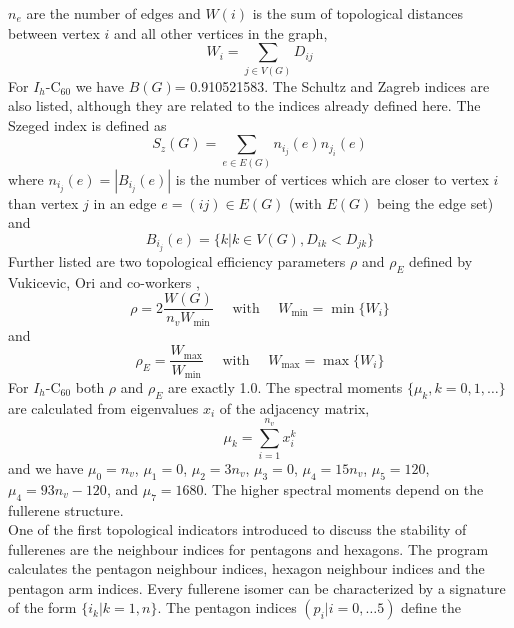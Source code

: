 \documentclass[article,a4paper,twoside]{memoir}
\newcommand{\C}[1]{\ensuremath{\mathrm{C}_{#1}}}
\begin{document}
$n_e$ are the number of edges and $W(i)$ is the sum of topological distances between vertex $i$ and all other vertices in the graph,
\begin{equation}
  \label{sum}
  W_i=\sum_{j \in V(G)} D_{ij}
\end{equation}
For $I_h$-\C{60} we have $B(G)$= 0.910521583. The Schultz and Zagreb indices are also listed, although they are related to
the indices already defined here. The Szeged index is defined as\cite{Heydari}
\begin{equation}
  \label{Szeged}
  S_z(G)=\sum_{e \in E(G)} n_{i_j}(e)n_{j_i}(e)
\end{equation}
where $n_{i_j}(e) = |B_{i_j}(e)|$ is the number of vertices which are closer to vertex $i$ than vertex $j$ in an edge $e=(ij) \in E(G)$ (with
$E(G)$ being the edge set) and
\begin{equation}
  \label{Szeged1}
  B_{i_j}(e)= \{ k | k \in V(G), D_{ik} < D_{jk} \}
\end{equation}
Further listed are two topological efficiency parameters $\rho$ and $\rho_E$ defined by Vukicevic, Ori and co-workers \cite{Vukicevic,Ori},
\begin{equation}
  \label{rho}
  \rho=2\frac{W(G)}{n_v W_{\mathrm{min}}} \quad \text{ with } \quad W_{\mathrm{min}}= \min \{ W_i \}
\end{equation}
and
\begin{equation}
  \label{rhoE}
  \rho_E=\frac{W_{\mathrm{max}}}{W_{\mathrm{min}}} \quad \text{ with } \quad W_{\mathrm{max}}= \max \{ W_i \}
\end{equation}
For $I_h$-\C{60} both $\rho$ and $\rho_E$ are exactly 1.0. The spectral moments $\{ \mu_k, k=0,1,\dots \} $ are calculated from eigenvalues $x_i$ of the adjacency matrix,
\begin{equation}
  \label{specmom}
  \mu_k=\sum_{i=1}^{n_v} x_i^k
\end{equation}
and we have $\mu_0 = n_v$, $\mu_1 = 0$, $\mu_2 = 3n_v$, $\mu_3 = 0$, $\mu_4 = 15n_v$, $\mu_5 = 120$, $\mu_4 = 93n_v - 120$, and $\mu_7 = 1680$.
The higher spectral moments depend on the fullerene structure.\cite{Fowler93}\\
One of the first topological indicators introduced to discuss the stability of fullerenes are the neighbour indices for pentagons and
hexagons. The program calculates the pentagon neighbour indices,\cite{Atlas,Albertazzi} hexagon neighbour indices and the pentagon arm indices.\cite{Reti}
Every fullerene isomer can be characterized by a signature of the form $\{i_k | k=1,n\}$. The pentagon indices $(p_i | i=0, \dots 5)$ define the
\end{document}
